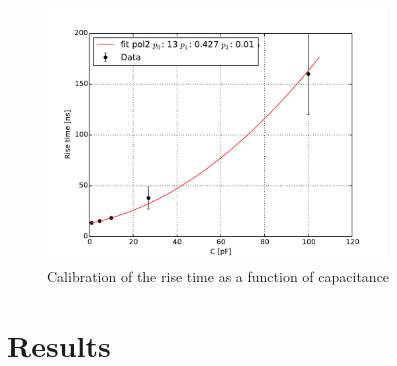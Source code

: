 \documentclass[12pt]{article}
\begin{document}
\begin{figure}[htb]
  \centering
  \includegraphics[width=0.8\textwidth]{./graphics/calibration_diode}
  \caption{Calibration of the rise time as a function of capacitance}
  \label{fig:RiseTime_vs_Capacitance}
\end{figure}

\section{Results}
\end{document}
